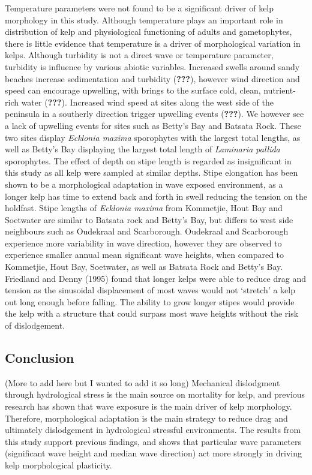 \documentclass[10pt,a4,]{article}
\begin{document}
Temperature parameters were not found to be a significant driver of kelp
morphology in this study. Although temperature plays an important role
in distribution of kelp and physiological functioning of adults and
gametophytes, there is little evidence that temperature is a driver of
morphological variation in kelps. Although turbidity is not a direct
wave or temperature parameter, turbidity is influence by various abiotic
variables. Increased swells around sandy beaches increase sedimentation
and turbidity ({\textbf{???}}), however wind direction and speed can
encourage upwelling, with brings to the surface cold, clean,
nutrient-rich water ({\textbf{???}}). Increased wind speed at sites
along the west side of the peninsula in a southerly direction trigger
upwelling events ({\textbf{???}}). We however see a lack of upwelling
events for sites such as Betty's Bay and Batsata Rock. These two sites
display \emph{Ecklonia maxima} sporophytes with the largest total
lengths, as well as Betty's Bay displaying the largest total length of
\emph{Laminaria pallida} sporophytes. The effect of depth on stipe
length is regarded as insignificant in this study as all kelp were
sampled at similar depths. Stipe elongation has been shown to be a
morphological adaptation in wave exposed environment, as a longer kelp
has time to extend back and forth in swell reducing the tension on the
holdfast. Stipe lengths of \emph{Ecklonia maxima} from Kommetjie, Hout
Bay and Soetwater are similar to Batsata rock and Betty's Bay, but
differs to west side neighbours such as Oudekraal and Scarborough.
Oudekraal and Scarborough experience more variability in wave direction,
however they are observed to experience smaller annual mean significant
wave heights, when compared to Kommetjie, Hout Bay, Soetwater, as well
as Batsata Rock and Betty's Bay. Friedland and Denny (1995) found that
longer kelps were able to reduce drag and tension as the sinusoidal
displacement of most waves would not `stretch' a kelp out long enough
before falling. The ability to grow longer stipes would provide the kelp
with a structure that could surpass most wave heights without the risk
of dislodgement.

\hypertarget{conclusion}{%
\subsection{Conclusion}\label{conclusion}}

(More to add here but I wanted to add it so long) Mechanical dislodgment
through hydrological stress is the main source on mortality for kelp,
and previous research has shown that wave exposure is the main driver of
kelp morphology. Therefore, morphological adaptation is the main
strategy to reduce drag and ultimately dislodgement in hydrological
stressful environments. The results from this study support previous
findings, and shows that particular wave parameters (significant wave
height and median wave direction) act more strongly in driving kelp
morphological plasticity.
\end{document}
